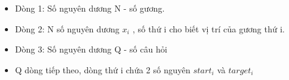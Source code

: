 \begin{itemize}
	\item Dòng 1: Số nguyên dương N - số gương.
	\item Dòng 2: N số nguyên dương $x_{i}$ , số thứ i cho biết vị trí của gương thứ i.
	\item Dòng 3: Số nguyên dương Q - số câu hỏi
	\item Q dòng tiếp theo, dòng thứ i chứa 2 số nguyên $start_{i}$ và $target_{i}$
\end{itemize}